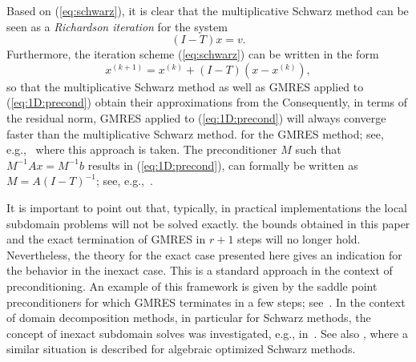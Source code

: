 Based on (\ref{eq:schwarz}), it is clear that the multiplicative Schwarz
method can be seen as a {\em Richardson iteration} for the system
\begin{equation}\label{eq:1D:precond}
(I-T)x=v.
\end{equation}
Furthermore, the iteration scheme (\ref{eq:schwarz}) can be written in the form
\begin{equation*}%
x^{(k+1)}= x^{(k)} + (I-T) (x-x^{(k)}),
\end{equation*}
so that the multiplicative Schwarz method as well as GMRES applied to
(\ref{eq:1D:precond}) obtain their approximations
from the 
Consequently, in terms of the residual norm, GMRES applied to
(\ref{eq:1D:precond}) will always converge faster than the multiplicative Schwarz
method. 
for the GMRES method; see, e.g.,~\cite{KahKamPhi07} where this approach is
taken. The preconditioner $M$ such that $M^{-1}Ax=M^{-1}b$ results in
(\ref{eq:1D:precond}), can formally be written as $M = A (I-T)^{-1}$; see,
e.g.,~\cite[Lemma 2.3]{LanRosSzy91}.



It is important to point out that, typically, in practical implementations the
local subdomain problems will not be solved exactly.  the bounds obtained in this paper and the exact termination of
GMRES in $r+1$ steps will no longer hold.
Nevertheless, the theory for the exact case presented here gives an indication
for the behavior in the inexact case. This is a standard approach in the
context of preconditioning. An example of this framework is given by the
saddle point preconditioners for which GMRES terminates in a few
steps; see~\cite{BenWat08}. In the context of domain decomposition methods, in
particular for Schwarz methods, the concept of inexact subdomain solves was
investigated, e.g., in~\cite[Section~4]{BenFroNabSzy01}.
See also \cite{GanLoiSzy12}, where a similar situation is described for
algebraic optimized Schwarz methods.

